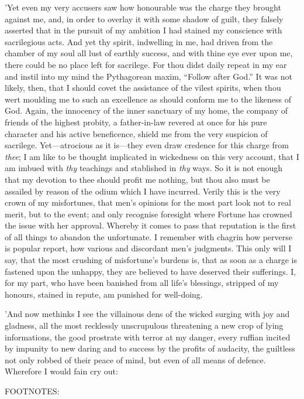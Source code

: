 'Yet even my very accusers saw how honourable was the charge they
brought against me, and, in order to overlay it with some shadow of
guilt, they falsely asserted that in the pursuit of my ambition I had
stained my conscience with sacrilegious acts. And yet thy spirit,
indwelling in me, had driven from the chamber of my soul all lust of
earthly success, and with thine eye ever upon me, there could be no
place left for sacrilege. For thou didst daily repeat in my ear and
instil into my mind the Pythagorean maxim, ``Follow after God.'' It was
not likely, then, that I should covet the assistance of the vilest
spirits, when thou wert moulding me to such an excellence as should
conform me to the likeness of God. Again, the innocency of the inner
sanctuary of my home, the company of friends of the highest probity, a
father-in-law revered at once for his pure character and his active
beneficence, shield me from the very suspicion of sacrilege.
Yet—atrocious as it is—they even draw credence for this charge from
\emph{thee}; I am like to be thought implicated in wickedness on this very
account, that I am imbued with \emph{thy} teachings and stablished in \emph{thy}
ways. So it is not enough that my devotion to thee should profit me
nothing, but thou also must be assailed by reason of the odium which I
have incurred. Verily this is the very crown of my misfortunes, that
men's opinions for the most part look not to real merit, but to the
event; and only recognise foresight where Fortune has crowned the issue
with her approval. Whereby it comes to pass that reputation is the first
of all things to abandon the unfortunate. I remember with chagrin how
perverse is popular report, how various and discordant men's judgments.
This only will I say, that the most crushing of misfortune's burdens is,
that as soon as a charge is fastened upon the unhappy, they are believed
to have deserved their sufferings. I, for my part, who have been
banished from all life's blessings, stripped of my honours, stained in
repute, am punished for well-doing.

'And now methinks I see the villainous dens of the wicked surging with
joy and gladness, all the most recklessly unscrupulous threatening a new
crop of lying informations, the good prostrate with terror at my danger,
every ruffian incited by impunity to new daring and to success by the
profits of audacity, the guiltless not only robbed of their peace of
mind, but even of all means of defence. Wherefore I would fain cry out:

FOOTNOTES:

